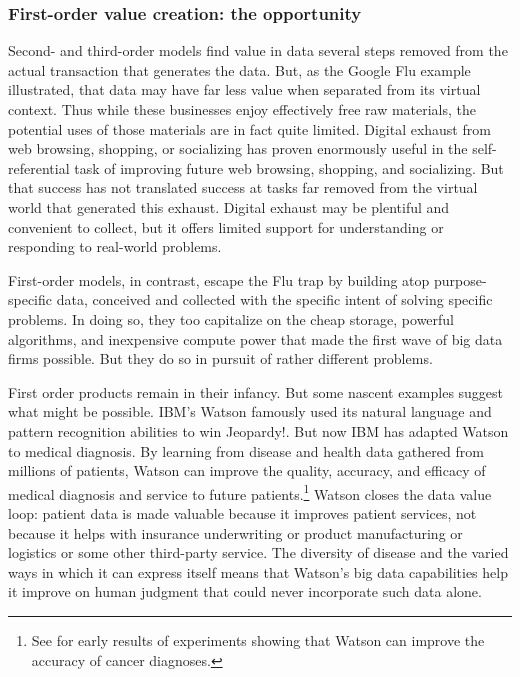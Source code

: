 \documentclass[12pt]{article}
\begin{document}

\subsubsection{First-order value creation: the opportunity}
\label{sec:first-order-value}

Second- and third-order models find value in data
several steps removed from the actual transaction that generates the
data. But, as the Google Flu example illustrated, that data may have
far less value when separated from its virtual context. Thus while
these businesses enjoy effectively free raw materials, the potential
uses of those materials are in fact quite limited. Digital exhaust
from web browsing, shopping, or socializing has proven enormously
useful in the self-referential task of improving future web browsing, shopping, and
socializing. But that success has not translated success at tasks far
removed from the virtual world that generated this exhaust. Digital
exhaust may be plentiful and convenient to collect, but it offers
limited support for understanding or responding to real-world problems.

First-order models, in contrast, escape the Flu trap by building atop
purpose-specific data, conceived and collected with the specific
intent of solving specific problems. In doing so, they too capitalize
on the cheap storage, powerful algorithms, and inexpensive compute
power that made the first wave of big data firms possible. But they do
so in pursuit of rather different problems.

First order products remain in their infancy. But some nascent
examples suggest what might be possible. IBM's Watson famously used
its natural language and pattern recognition abilities to win
Jeopardy!. But now IBM has adapted Watson to medical diagnosis. By
learning from disease and health data gathered from millions of
patients, Watson can improve the quality, accuracy, and efficacy of
medical diagnosis and service to future patients.\footnote{See
\cite{wired2013a} for early results of experiments showing that Watson
can improve the accuracy of cancer diagnoses.} Watson closes the data
value loop: patient data is made valuable because it improves patient
services, not because it helps with insurance underwriting or product
manufacturing or logistics or some other third-party service. The
diversity of disease and the varied ways in which it can express
itself means that Watson's big data capabilities help it improve on
human judgment that could never incorporate such data alone.
\end{document}
